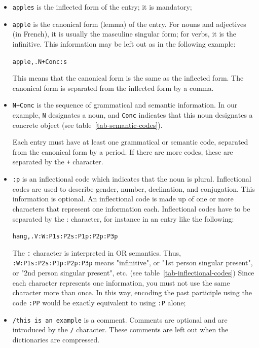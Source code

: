 \bigskip
\begin{itemize}
  \item \verb+apples+ is the inflected form of the entry; it is mandatory;
  
  \bigskip \item \verb+apple+ is the canonical form (lemma) of the
  entry. For nouns and adjectives (in French), it is usually the
  masculine singular form; for verbs, it is the infinitive. This information may
  be left out as in the following example:
  
  \bigskip
  \verb$apple,.N+Conc:s$
  
  \bigskip This means that the canonical form is the same as the inflected form.
  The canonical form is separated from the inflected form by a
  comma.\index{\verb+,+}
  
  \bigskip \item \verb$N+Conc$ is the sequence of grammatical and semantic
  information.  In our
  example, \verb+N+ designates a noun, and \verb+Conc+ indicates that this noun
  designates a concrete object (see table~\ref{tab-semantic-codes}).
  
  Each entry must have at least one grammatical or semantic code, separated from
  the canonical form by a period. If there are more codes, these are separated by
  the \verb$+$\index{\verb$+$} character.
  
  \bigskip \item \verb+:p+ is an inflectional code which indicates that the noun
  is  plural. Inflectional codes are used to
  describe gender, number, declination, and conjugation. This information is
  optional. An inflectional code is made up of one or more characters that
  represent one information each. Inflectional codes have to be separated by the
  : character, for instance in an entry like the following:
  
  \verb+hang,.V:W:P1s:P2s:P1p:P2p:P3p+
  
  The \verb+:+ character is interpreted in OR semantics. Thus,
  \verb+:W:P1s:P2s:P1p:P2p:P3p+ means "infinitive", or "1st person singular
  present", or "2nd person singular present", etc. (see
  table~\ref{tab-inflectional-codes}) Since each character
  represents one information, you must not use the same character
  more than once. In this way, encoding the past participle using the code \verb+:PP+ would be
  exactly equivalent to using \verb+:P+ alone;\index{\verb+:+}
  
  \bigskip \item \verb+/this is an example+ is a comment. Comments are optional
  and are introduced by the \verb+/+ character. These comments are left out when
  the dictionaries are compressed. 
   \index{\verb+/+}
\end{itemize}

